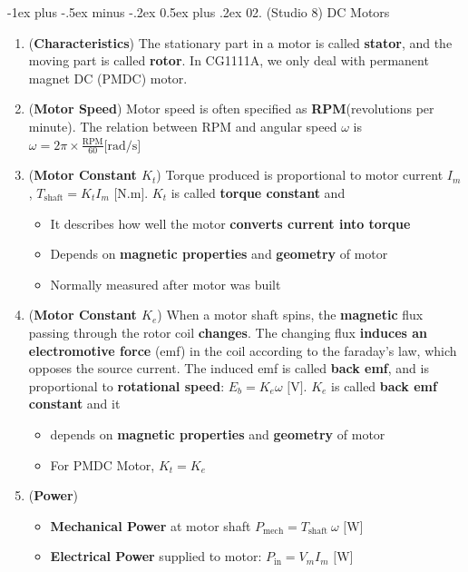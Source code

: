 \documentclass[10pt, landscape]{article}
\makeatletter
\renewcommand{\section}{\@startsection{section}{1}{0mm}%
                                {-1ex plus -.5ex minus -.2ex}%
                                {0.5ex plus .2ex}%
                                {\normalfont\large\bfseries}}
\makeatother
\begin{document}
\begin{multicols}{4}
\section{02. (Studio 8) DC Motors}
\begin{enumerate}
    \item (\textbf{Characteristics}) The stationary part in a motor is called \textbf{stator}, and the moving part is called \textbf{rotor}. In CG1111A, we only deal with permanent magnet DC (PMDC) motor.
    \item (\textbf{Motor Speed}) Motor speed is often specified as \textbf{RPM}(revolutions per minute). The relation between RPM and angular speed $\omega$ is $\omega=2\pi \times \frac{\text{RPM}}{60} \text{[rad/s]}$
    \item (\textbf{Motor Constant $K_t$}) Torque produced is proportional to motor current $I_m$, $T_{\text{shaft}}=K_tI_m \text{ [N.m]}$. $K_t$ is called \textbf{torque constant} and
    \begin{itemize}
        \item It describes how well the motor \textbf{converts current into torque}
        \item Depends on \textbf{magnetic properties} and \textbf{geometry} of motor
        \item Normally measured after motor was built
    \end{itemize}
    \item (\textbf{Motor Constant $K_e$}) When a motor shaft spins, the \textbf{magnetic} flux passing through the rotor coil \textbf{changes}. The changing flux \textbf{induces an electromotive force} (emf) in the coil according to the faraday's law, which opposes the source current. The induced emf is called \textbf{back emf}, and is proportional to \textbf{rotational speed}: $E_b=K_e\omega \text{ [V]}$. $K_e$ is called \textbf{back emf constant} and it
    \begin{itemize}
        \item depends on \textbf{magnetic properties} and \textbf{geometry} of motor
        \item For PMDC Motor, $K_t=K_e$
    \end{itemize}
    \item (\textbf{Power})
    \begin{itemize}
        \item \textbf{Mechanical Power} at motor shaft $P_{\text{mech}}=T_{\text{shaft}}~\omega \text{ [W]}$
        \item \textbf{Electrical Power} supplied to motor: $P_{\text{in}}=V_mI_m \text{ [W]}$

\end{itemize}
\end{enumerate}
\end{multicols}
\end{document}
